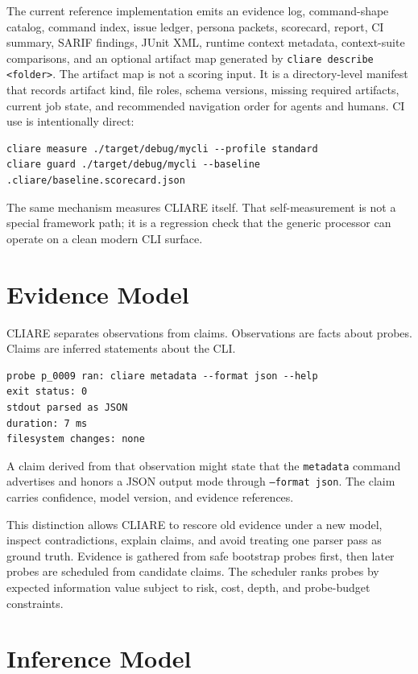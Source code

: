 \documentclass[11pt]{article}
\begin{document}
The current reference implementation emits an evidence log, command-shape catalog, command index, issue ledger, persona packets, scorecard, report, CI summary, SARIF findings, JUnit XML, runtime context metadata, context-suite comparisons, and an optional artifact map generated by \texttt{cliare describe <folder>}. The artifact map is not a scoring input. It is a directory-level manifest that records artifact kind, file roles, schema versions, missing required artifacts, current job state, and recommended navigation order for agents and humans. CI use is intentionally direct:

\begin{verbatim}
cliare measure ./target/debug/mycli --profile standard
cliare guard ./target/debug/mycli --baseline .cliare/baseline.scorecard.json
\end{verbatim}

The same mechanism measures CLIARE itself. That self-measurement is not a special framework path; it is a regression check that the generic processor can operate on a clean modern CLI surface.

\section{Evidence Model}

CLIARE separates observations from claims. Observations are facts about probes. Claims are inferred statements about the CLI.

\begin{verbatim}
probe p_0009 ran: cliare metadata --format json --help
exit status: 0
stdout parsed as JSON
duration: 7 ms
filesystem changes: none
\end{verbatim}

A claim derived from that observation might state that the \texttt{metadata} command advertises and honors a JSON output mode through \texttt{--format json}. The claim carries confidence, model version, and evidence references.

This distinction allows CLIARE to rescore old evidence under a new model, inspect contradictions, explain claims, and avoid treating one parser pass as ground truth. Evidence is gathered from safe bootstrap probes first, then later probes are scheduled from candidate claims. The scheduler ranks probes by expected information value subject to risk, cost, depth, and probe-budget constraints.

\section{Inference Model}
\end{document}
